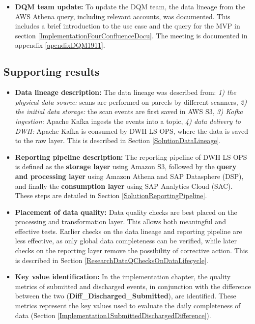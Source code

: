 \begin{itemize}
\item \textbf{DQM team update:} To update the DQM team, the data lineage from the AWS Athena query, including relevant accounts, was documented. This includes a brief introduction to the use case and the query for the MVP in section \ref{ImplementationFourConfluenceDocu}. The meeting is documented in appendix \ref{apendixDQM1911}.

\end{itemize}

\subsection*{Supporting results}

\begin{itemize}
\item \textbf{Data lineage description:} The data lineage was described from: \textit{1) the physical data source:} scans are performed on parcels by different scanners, \textit{2) the initial data storage:} the scan events are first saved in AWS S3, \textit{3) Kafka ingestion:} Apache Kafka ingests the events into a topic, \textit{4) data delivery to DWH:} Apache Kafka is consumed by DWH LS OPS, where the data is saved to the raw layer. This is described in Section \ref{SolutionDataLineage}.

\item \textbf{Reporting pipeline description:} The reporting pipeline of DWH LS OPS is defined as the \textbf{storage layer} using Amazon S3, followed by the \textbf{query and processing layer} using Amazon Athena and SAP Datasphere (DSP), and finally the \textbf{consumption layer} using SAP Analytics Cloud (SAC). These steps are detailed in Section \ref{SolutionReportingPipeline}.

\item \textbf{Placement of data quality:} Data quality checks are best placed on the processing and transformation layer. This allows both meaningful and effective tests. Earlier checks on the data lineage and reporting pipeline are less effective, as only global data completeness can be verified, while later checks on the reporting layer remove the possibility of corrective action. This is described in Section \ref{ResearchDataQChecksOnDataLifecycle}.

\item \textbf{Key value identification:} In the implementation chapter, the quality metrics of submitted and discharged events, in conjunction with the difference between the two (\textbf{Diff\_Discharged\_Submitted}), are identified. These metrics represent the key values used to evaluate the daily completeness of data (Section \ref{Implementation1SubmittedDischargedDifference}).
\end{itemize}

